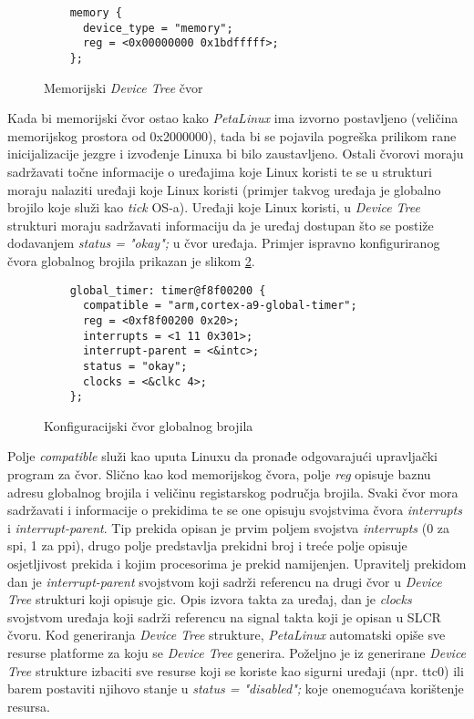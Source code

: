 \documentclass[times, utf8, diplomski, numeric]{fer}
\begin{document}
\begin{figure}[H]
  \lstset{xleftmargin=.1\textwidth}
  \begin{lstlisting}
    memory {
      device_type = "memory";
      reg = <0x00000000 0x1bdfffff>;
    };
  \end{lstlisting}
  \caption{Memorijski \textit{Device Tree} čvor}
  \label{mem_node}
\end{figure}

Kada bi memorijski čvor ostao kako \textit{PetaLinux} ima izvorno postavljeno (veličina memorijskog prostora od 0x2000000),
tada bi se pojavila pogreška prilikom rane inicijalizacije jezgre i izvođenje Linuxa bi bilo zaustavljeno.
Ostali čvorovi moraju sadržavati
točne informacije o uređajima koje Linux koristi te se u strukturi moraju nalaziti uređaji koje Linux koristi (primjer takvog
uređaja je globalno brojilo koje služi kao \textit{tick} OS-a). Uređaji koje Linux koristi, u \textit{Device Tree} strukturi moraju sadržavati informaciju da
je uređaj dostupan što se postiže dodavanjem \textit{status = "okay";} u čvor uređaja. Primjer ispravno konfiguriranog čvora
globalnog brojila prikazan je slikom \ref{glob_timer}.

\begin{figure}[H]
  \lstset{xleftmargin=.1\textwidth}
  \begin{lstlisting}
    global_timer: timer@f8f00200 {
      compatible = "arm,cortex-a9-global-timer";
      reg = <0xf8f00200 0x20>;
      interrupts = <1 11 0x301>;
      interrupt-parent = <&intc>;
      status = "okay";
      clocks = <&clkc 4>;
    };
  \end{lstlisting}
  \caption{Konfiguracijski čvor globalnog brojila}
  \label{glob_timer}
\end{figure}

Polje \textit{compatible} služi kao uputa Linuxu da pronađe odgovarajući
upravljački program za čvor. Slično kao kod memorijskog čvora, polje \textit{reg} opisuje baznu adresu globalnog brojila i
veličinu registarskog područja brojila. Svaki čvor mora sadržavati i informacije o prekidima te se one opisuju svojstvima
čvora \textit{interrupts} i \textit{interrupt-parent}. Tip prekida opisan je prvim poljem svojstva \textit{interrupts} (0 za
\gls{spi}, 1 za \gls{ppi}), drugo polje predstavlja prekidni broj i treće polje opisuje osjetljivost prekida i kojim procesorima je prekid
namijenjen. Upravitelj prekidom dan je \textit{interrupt-parent} svojstvom koji sadrži referencu na drugi čvor u \textit{Device
Tree} strukturi koji opisuje \gls{gic}. Opis izvora takta za uređaj, dan je \textit{clocks} svojstvom uređaja koji sadrži referencu
na signal takta koji je opisan u SLCR čvoru.
Kod generiranja \textit{Device Tree} strukture, \textit{PetaLinux} automatski opiše sve resurse platforme za koju se
\textit{Device Tree} generira. Poželjno je iz generirane \textit{Device Tree} strukture izbaciti sve resurse koji se koriste
kao sigurni uređaji (npr. \gls{ttc}0) ili barem postaviti njihovo stanje u \textit{status = "disabled";} koje onemogućava korištenje
resursa.
\end{document}
